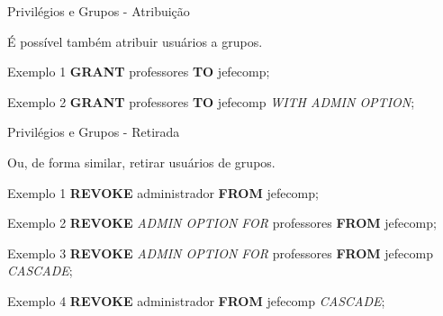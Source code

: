 \documentclass[xcolor=x11names,compress]{beamer}
\begin{document}
\begin{frame}{Privilégios e Grupos - Atribuição}

É possível também atribuir usuários a grupos. 

\begin{alertblock}{Exemplo 1}
\textbf{GRANT} professores \textbf{TO} jefecomp;
\end{alertblock}

\begin{alertblock}{Exemplo 2}
\textbf{GRANT} professores \textbf{TO} jefecomp \textit{WITH ADMIN OPTION};
\end{alertblock}

\end{frame}

\begin{frame}{Privilégios e Grupos - Retirada}

Ou, de forma similar, retirar usuários de grupos.

\begin{alertblock}{Exemplo 1}
\textbf{REVOKE} administrador \textbf{FROM} jefecomp;
\end{alertblock}

\begin{alertblock}{Exemplo 2}
\textbf{REVOKE} \textit{ADMIN OPTION FOR} professores \textbf{FROM} jefecomp;
\end{alertblock}

\begin{alertblock}{Exemplo 3}
\textbf{REVOKE} \textit{ADMIN OPTION FOR} professores \textbf{FROM} jefecomp \textit{CASCADE};
\end{alertblock}

\begin{alertblock}{Exemplo 4}
\textbf{REVOKE} administrador \textbf{FROM} jefecomp \textit{CASCADE};
\end{alertblock}

\end{frame}


\section{}
\end{document}
